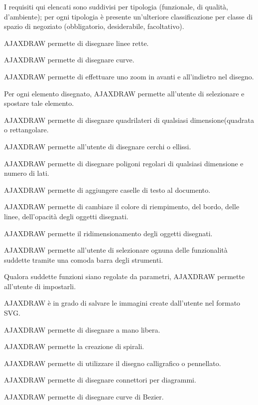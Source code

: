 \label{listarequisiti}
I requisiti qui elencati sono suddivisi per tipologia (funzionale, di qualit\`a, d'ambiente); 
per ogni tipologia \`e presente un'ulteriore classificazione per classe di spazio di negoziato (obbligatorio, desiderabile, facoltativo). 
\begin{elenconumerato}{\subsubsecindent}
\item{AJAXDRAW permette di disegnare linee rette.}
\item{AJAXDRAW permette di disegnare curve.}
\item{AJAXDRAW permette di effettuare uno zoom in avanti e all'indietro nel disegno.}
\item{Per ogni elemento disegnato, AJAXDRAW permette all'utente di selezionare e spostare tale elemento.}
\item{AJAXDRAW permette di disegnare quadrilateri di qualsiasi dimensione(quadrata o rettangolare.}
\item{AJAXDRAW permette all'utente di disegnare cerchi o ellissi.}
\item{AJAXDRAW permette di disegnare poligoni regolari di qualsiasi dimensione e numero di lati.}
\item{AJAXDRAW permette di aggiungere caselle di testo al documento. }
\item{AJAXDRAW permette di cambiare il colore di riempimento, del bordo, delle linee, dell'opacità degli oggetti disegnati.}
\item{AJAXDRAW permette il ridimensionamento degli oggetti disegnati.}
\item{AJAXDRAW permette all'utente di selezionare ognuna delle funzionalit\`a suddette tramite una comoda barra degli strumenti.}
\item{Qualora suddette funzioni siano regolate da parametri, AJAXDRAW permette all'utente di impostarli.}
\item{AJAXDRAW \`e in grado di salvare le immagini create dall'utente nel formato SVG.}
\end{elenconumerato}

\begin{elenconumerato}{\subsubsecindent}
\item{AJAXDRAW permette di disegnare a mano libera.}
\item{AJAXDRAW permette la creazione di spirali.}
\item{AJAXDRAW permette di utilizzare il disegno calligrafico o pennellato.}
\item{AJAXDRAW permette di disegnare connettori per diagrammi.}
\item{AJAXDRAW permette di disegnare curve di Bezier.}
\end{elenconumerato}

